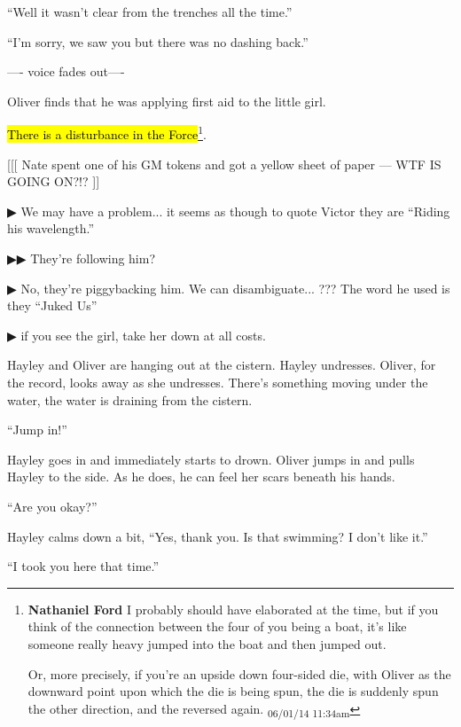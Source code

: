``Well it wasn't clear from the trenches all the time.''

``I'm sorry, we saw you but there was no dashing back.''

---- voice fades out----

Oliver finds that he was applying first aid to the little girl.

 \hl{There is a disturbance in the Force}\footnote{\textbf{Nathaniel Ford }I probably should have elaborated at the time, but if you think of the connection between the four of you being a boat, it's like someone really heavy jumped into the boat and then jumped out.

Or, more precisely, if you're an upside down four-sided die, with Oliver as the downward point upon which the die is being spun, the die is suddenly spun the other direction, and the reversed again. \textsubscript{06/01/14 11:34am}}.

{[}{[}{[} Nate spent one of his GM tokens and got a yellow sheet of paper --- WTF IS GOING ON?!? {]}{]}



 {\color[RGB]{68,68,68}▶}  We may have a problem... it seems as though to quote Victor they are ``Riding his wavelength.''

 {\color[RGB]{68,68,68}▶▶} They're following him?

 {\color[RGB]{68,68,68}▶} No, they're piggybacking him.  We can disambiguate... ??? The word he used is they ``Juked Us''

 {\color[RGB]{68,68,68}▶}  if you see the girl, take her down at all costs. 




Hayley and Oliver are hanging out at the cistern.  Hayley undresses.  Oliver, for the record, looks away as she undresses.  There's something moving under the water, the water is draining from the cistern.

``Jump in!''

Hayley goes in and immediately starts to drown.  Oliver jumps in and pulls Hayley to the side. As he does, he can feel her scars beneath his hands.

``Are you okay?''

Hayley calms down a bit, ``Yes, thank you.  Is that swimming?  I don't like it.''

``I took you here that time.''

